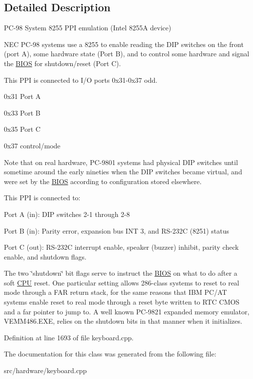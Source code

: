 \subsection{Detailed Description}
P\-C-\/98 System 8255 P\-P\-I emulation (Intel 8255\-A device) 

N\-E\-C P\-C-\/98 systems use a 8255 to enable reading the D\-I\-P switches on the front (port A), some hardware state (Port B), and to control some hardware and signal the \hyperlink{classBIOS}{B\-I\-O\-S} for shutdown/reset (Port C).

This P\-P\-I is connected to I/\-O ports 0x31-\/0x37 odd.
\begin{DoxyItemize}
\item 0x31 Port A
\item 0x33 Port B
\item 0x35 Port C
\item 0x37 control/mode
\end{DoxyItemize}

Note that on real hardware, P\-C-\/9801 systems had physical D\-I\-P switches until sometime around the early nineties when the D\-I\-P switches became virtual, and were set by the \hyperlink{classBIOS}{B\-I\-O\-S} according to configuration stored elsewhere.

This P\-P\-I is connected to\-:
\begin{DoxyItemize}
\item Port A (in)\-: D\-I\-P switches 2-\/1 through 2-\/8
\item Port B (in)\-: Parity error, expansion bus I\-N\-T 3, and R\-S-\/232\-C (8251) status
\item Port C (out)\-: R\-S-\/232\-C interrupt enable, speaker (buzzer) inhibit, parity check enable, and shutdown flags.
\end{DoxyItemize}

The two \char`\"{}shutdown\char`\"{} bit flags serve to instruct the \hyperlink{classBIOS}{B\-I\-O\-S} on what to do after a soft \hyperlink{classCPU}{C\-P\-U} reset. One particular setting allows 286-\/class systems to reset to real mode through a F\-A\-R return stack, for the same reasons that I\-B\-M P\-C/\-A\-T systems enable reset to real mode through a reset byte written to R\-T\-C C\-M\-O\-S and a far pointer to jump to. A well known P\-C-\/9821 expanded memory emulator, V\-E\-M\-M486.\-E\-X\-E, relies on the shutdown bits in that manner when it initializes. 

Definition at line 1693 of file keyboard.\-cpp.



The documentation for this class was generated from the following file\-:\begin{DoxyCompactItemize}
\item 
src/hardware/keyboard.\-cpp\end{DoxyCompactItemize}
